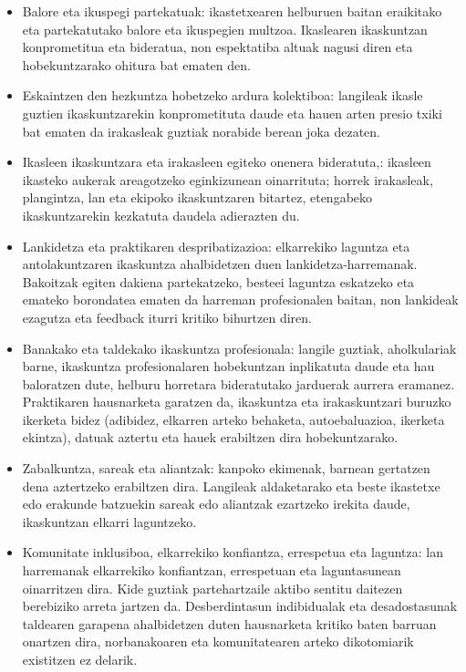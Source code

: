 \begin{itemize}
    \item Balore eta ikuspegi partekatuak: ikastetxearen helburuen baitan eraikitako eta partekatutako balore eta ikuspegien multzoa. Ikaslearen ikaskuntzan konprometitua eta bideratua, non espektatiba altuak nagusi diren eta hobekuntzarako ohitura bat ematen den.
    \item Eskaintzen den hezkuntza hobetzeko ardura kolektiboa: langileak ikasle guztien ikaskuntzarekin konprometituta daude eta hauen arten presio txiki bat ematen da irakasleak guztiak norabide berean joka dezaten.
    \item Ikasleen ikaskuntzara eta irakasleen egiteko onenera bideratuta,: ikasleen ikasteko aukerak areagotzeko eginkizunean oinarrituta; horrek irakasleak, plangintza, lan eta ekipoko ikaskuntzaren bitartez, etengabeko ikaskuntzarekin kezkatuta daudela adierazten du.
    \item Lankidetza eta praktikaren despribatizazioa: elkarrekiko laguntza eta antolakuntzaren ikaskuntza ahalbidetzen duen lankidetza-harremanak. Bakoitzak egiten dakiena partekatzeko, besteei laguntza eskatzeko eta emateko borondatea ematen da harreman profesionalen baitan, non lankideak ezagutza eta feedback iturri kritiko bihurtzen diren.
    \item Banakako eta taldekako ikaskuntza profesionala: langile guztiak, aholkulariak barne, ikaskuntza profesionalaren hobekuntzan inplikatuta daude eta hau baloratzen dute, helburu horretara bideratutako jarduerak aurrera eramanez. Praktikaren hausnarketa garatzen da, ikaskuntza eta irakaskuntzari buruzko ikerketa bidez (adibidez, elkarren arteko behaketa, autoebaluazioa, ikerketa ekintza), datuak aztertu eta hauek erabiltzen dira hobekuntzarako.
    \item Zabalkuntza, sareak eta aliantzak: kanpoko ekimenak, barnean gertatzen dena aztertzeko erabiltzen dira. Langileak aldaketarako eta beste ikastetxe edo erakunde batzuekin sareak edo aliantzak ezartzeko irekita daude, ikaskuntzan elkarri laguntzeko.
    \item Komunitate inklusiboa, elkarrekiko konfiantza, errespetua eta laguntza: lan harremanak elkarrekiko konfiantzan, errespetuan eta laguntasunean oinarritzen dira. Kide guztiak partehartzaile aktibo sentitu daitezen berebiziko arreta jartzen da. Desberdintasun indibidualak eta desadostasunak taldearen garapena ahalbidetzen duten hausnarketa kritiko baten barruan onartzen dira, norbanakoaren eta komunitatearen arteko dikotomiarik existitzen ez delarik.
\end{itemize}

